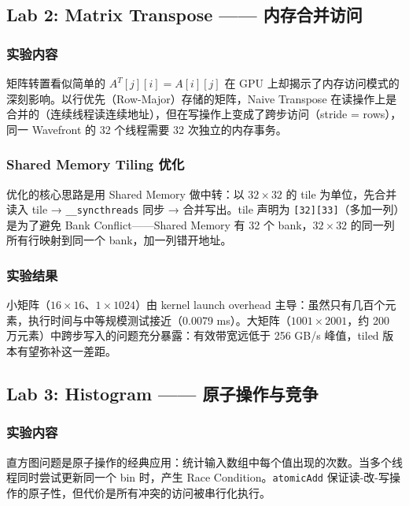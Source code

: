 \documentclass[a4paper]{article}
\begin{document}
\subsection{Lab 2: Matrix Transpose —— 内存合并访问}

\subsubsection{实验内容}

矩阵转置看似简单的 $A^T[j][i] = A[i][j]$ 在 GPU 上却揭示了内存访问模式的深刻影响。以行优先（Row-Major）存储的矩阵，Naive Transpose 在读操作上是合并的（连续线程读连续地址），但在写操作上变成了跨步访问（stride = rows），同一 Wavefront 的 32 个线程需要 32 次独立的内存事务。

\subsubsection{Shared Memory Tiling 优化}

优化的核心思路是用 Shared Memory 做中转：以 $32\times 32$ 的 tile 为单位，先合并读入 tile → \texttt{\_\_syncthreads} 同步 → 合并写出。tile 声明为 \texttt{[32][33]}（多加一列）是为了避免 Bank Conflict——Shared Memory 有 32 个 bank，$32\times 32$ 的同一列所有行映射到同一个 bank，加一列错开地址。

\subsubsection{实验结果}

小矩阵（$16\times16$、$1\times1024$）由 kernel launch overhead 主导：虽然只有几百个元素，执行时间与中等规模测试接近（0.0079 ms）。大矩阵（$1001\times2001$，约 200 万元素）中跨步写入的问题充分暴露：有效带宽远低于 256 GB/s 峰值，tiled 版本有望弥补这一差距。

\subsection{Lab 3: Histogram —— 原子操作与竞争}

\subsubsection{实验内容}

直方图问题是原子操作的经典应用：统计输入数组中每个值出现的次数。当多个线程同时尝试更新同一个 bin 时，产生 Race Condition。\texttt{atomicAdd} 保证读-改-写操作的原子性，但代价是所有冲突的访问被串行化执行。
\end{document}
